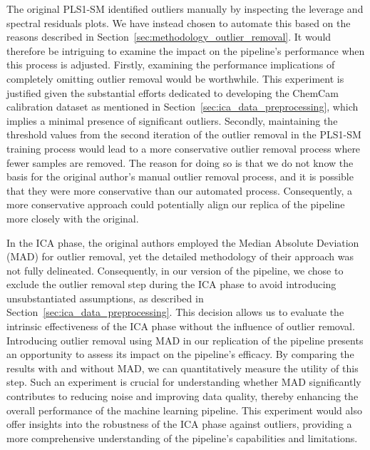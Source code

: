 The original PLS1-SM identified outliers manually by inspecting the leverage and spectral residuals plots.
We have instead chosen to automate this based on the reasons described in Section~\ref{sec:methodology_outlier_removal}.
It would therefore be intriguing to examine the impact on the pipeline's performance when this process is adjusted.
Firstly, examining the performance implications of completely omitting outlier removal would be worthwhile.
This experiment is justified given the substantial efforts dedicated to developing the ChemCam calibration dataset as mentioned in Section~\ref{sec:ica_data_preprocessing}, which implies a minimal presence of significant outliers.
Secondly, maintaining the threshold values from the second iteration of the outlier removal in the PLS1-SM training process would lead to a more conservative outlier removal process where fewer samples are removed.
The reason for doing so is that we do not know the basis for the original author's manual outlier removal process, and it is possible that they were more conservative than our automated process.
Consequently, a more conservative approach could potentially align our replica of the pipeline more closely with the original.

In the ICA phase, the original authors employed the Median Absolute Deviation (MAD) for outlier removal, yet the detailed methodology of their approach was not fully delineated.
Consequently, in our version of the pipeline, we chose to exclude the outlier removal step during the ICA phase to avoid introducing unsubstantiated assumptions, as described in Section~\ref{sec:ica_data_preprocessing}.
This decision allows us to evaluate the intrinsic effectiveness of the ICA phase without the influence of outlier removal.
Introducing outlier removal using MAD in our replication of the pipeline presents an opportunity to assess its impact on the pipeline's efficacy.
By comparing the results with and without MAD, we can quantitatively measure the utility of this step.
Such an experiment is crucial for understanding whether MAD significantly contributes to reducing noise and improving data quality, thereby enhancing the overall performance of the machine learning pipeline.
This experiment would also offer insights into the robustness of the ICA phase against outliers, providing a more comprehensive understanding of the pipeline's capabilities and limitations.

